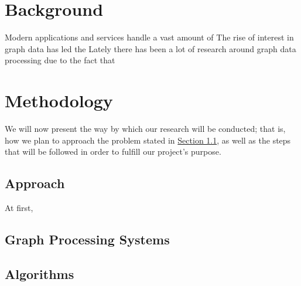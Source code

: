\documentclass[a4paper,11pt]{article}
\begin{document}




\section{Background} \label{background}

\par Modern applications and services handle a vast amount of 
The rise of interest in graph data has led the Lately there has been a lot of research around graph data processing due to the fact that 


\section{Methodology} \label{methodology}

\par We will now present the way by which our research will be conducted; that is, how we plan to approach the problem stated in \hyperref[problem-statement]{Section 1.1}, as well as the steps that will be followed in order to fulfill our project's purpose.

\subsection{Approach}

\par At first,

\subsection{Graph Processing Systems}


\subsection{Algorithms}
\end{document}

